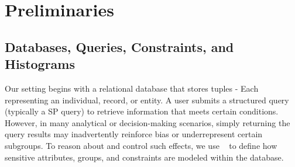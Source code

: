 \section{Preliminaries}
\label{sec:prelim}

\subsection{Databases, Queries, Constraints, and Histograms}


Our setting begins with a relational database that stores tuples - Each representing an individual, record, or entity. A user submits a structured query (typically a SP query) to retrieve information that meets certain conditions. However, in many analytical or decision-making scenarios, simply returning the query results may inadvertently reinforce bias or underrepresent certain subgroups. To reason about and control such effects, we use ~\cite{SYJ18,barocas-hardt-narayanan,impossibilityfairness} to define how sensitive attributes, groups, and constraints are modeled within the database.


